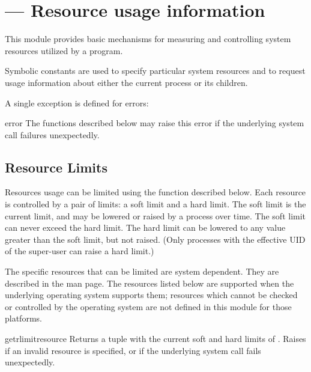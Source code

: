 \section{ ---
         Resource usage information}



This module provides basic mechanisms for measuring and controlling
system resources utilized by a program.

Symbolic constants are used to specify particular system resources and
to request usage information about either the current process or its
children.

A single exception is defined for errors:


\begin{excdesc}{error}
  The functions described below may raise this error if the underlying
  system call failures unexpectedly.
\end{excdesc}

\subsection{Resource Limits}

Resources usage can be limited using the  function
described below. Each resource is controlled by a pair of limits: a
soft limit and a hard limit. The soft limit is the current limit, and
may be lowered or raised by a process over time. The soft limit can
never exceed the hard limit. The hard limit can be lowered to any
value greater than the soft limit, but not raised. (Only processes with
the effective UID of the super-user can raise a hard limit.)

The specific resources that can be limited are system dependent. They
are described in the  man page.  The resources
listed below are supported when the underlying operating system
supports them; resources which cannot be checked or controlled by the
operating system are not defined in this module for those platforms.

\begin{funcdesc}{getrlimit}{resource}
  Returns a tuple  with the current
  soft and hard limits of . Raises  if
  an invalid resource is specified, or  if the
  underlying system call fails unexpectedly.
\end{funcdesc}

